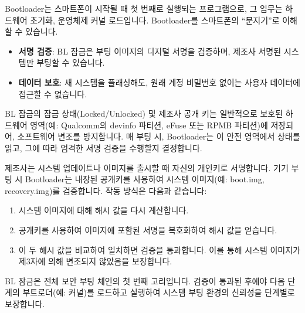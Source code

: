 


Bootloader는 스마트폰이 시작될 때 첫 번째로 실행되는 프로그램으로, 그 임무는 하드웨어 초기화, 운영체제 커널 로드입니다. Bootloader를 스마트폰의 “문지기”로 이해할 수 있습니다.


\begin{itemize}
  \item \textbf{서명 검증}: BL 잠금은 부팅 이미지의 디지털 서명을 검증하며, 제조사 서명된 시스템만 부팅할 수 있습니다.
  \item \textbf{데이터 보호}: 새 시스템을 플래싱해도, 원래 계정 비밀번호 없이는 사용자 데이터에 접근할 수 없습니다.
\end{itemize}


BL 잠금의 잠금 상태(Locked/Unlocked) 및 제조사 공개 키는 일반적으로 보호된 하드웨어 영역(예: Qualcomm의 devinfo 파티션, eFuse 또는 RPMB 파티션)에 저장되어, 소프트웨어 변조를 방지합니다. 매 부팅 시, Bootloader는 이 안전 영역에서 상태를 읽고, 그에 따라 엄격한 서명 검증을 수행할지 결정합니다.


제조사는 시스템 업데이트나 이미지를 출시할 때 자신의 개인키로 서명합니다. 기기 부팅 시 Bootloader는 내장된 공개키를 사용하여 시스템 이미지(예: boot.img, recovery.img)를 검증합니다. 작동 방식은 다음과 같습니다:

\begin{enumerate}
  \item 시스템 이미지에 대해 해시 값을 다시 계산합니다.
  \item 공개키를 사용하여 이미지에 포함된 서명을 복호화하여 해시 값을 얻습니다.
  \item 이 두 해시 값을 비교하여 일치하면 검증을 통과합니다. 이를 통해 시스템 이미지가 제3자에 의해 변조되지 않았음을 보장합니다.
\end{enumerate}


BL 잠금은 전체 보안 부팅 체인의 첫 번째 고리입니다. 검증이 통과된 후에야 다음 단계의 부트로더(예: 커널)를 로드하고 실행하여 시스템 부팅 환경의 신뢰성을 단계별로 보장합니다.

